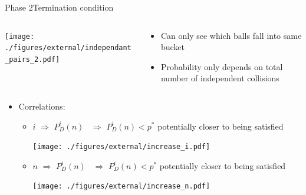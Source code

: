\documentclass[aspectratio=169, hyperref={colorlinks=true, allcolors=SecondaryColor}, c]{beamer}
\begin{document}
	\begin{frame}[fragile]{Phase 2}{Termination condition}
		\begin{columns}
			\begin{column}{0.5\textwidth}
				\texttt{[image: ./figures/external/independant\_pairs\_2.pdf]}
			\end{column}
			\begin{column}{0.5\textwidth}
				\begin{itemize}
					\item Can only see which balls fall into same bucket
					\item Probability \alert{only} depends on \alert{total number of independent collisions}
				\end{itemize}
			\end{column}
		\end{columns}
		\begin{itemize}
			\item \alert{Correlations}:
			\begin{itemize}
				\item {\thickuparrow} $i$ \alert{$\Rightarrow$} $P^i_D(n)$ {\thickdownarrow}\, \alert{$\Rightarrow$} $P^i_D(n) < p^*$ potentially closer to being satisfied %
				\vspace{-0.4cm}

				\texttt{[image: ./figures/external/increase\_i.pdf]} %
				\item {\thickuparrow} $n$ \alert{$\Rightarrow$} $P^i_D(n)$ {\thickdownarrow}\, \alert{$\Rightarrow$} $P^i_D(n) < p^*$ potentially closer to being satisfied %
				\vspace{-0.4cm}

				\texttt{[image: ./figures/external/increase\_n.pdf]} %
			\end{itemize}
		\end{itemize}
	\end{frame}
\end{document}
